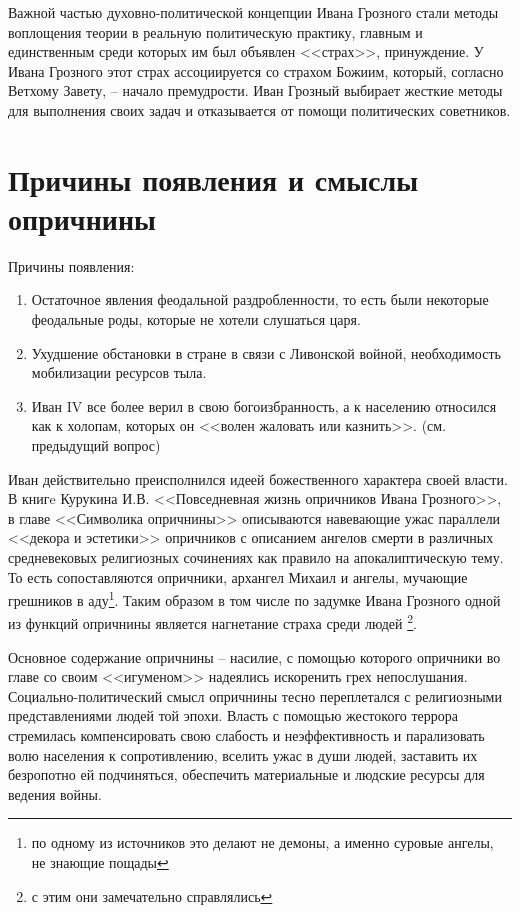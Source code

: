 \documentclass[12pt]{article}
\begin{document}
  Важной частью духовно-политической концепции Ивана Грозного стали методы воплощения теории в реальную политическую практику,
  главным и единственным среди которых им был объявлен <<страх>>, принуждение.
  У  Ивана Грозного этот страх ассоциируется со страхом Божиим, который, согласно Ветхому Завету, -- начало премудрости.
  Иван Грозный выбирает жесткие методы для выполнения своих задач и отказывается от помощи политических советников.

  \section{Причины появления и смыслы опричнины\protect\footnotemark}
  Причины появления:
  \begin{enumerate}
    \item Остаточное явления феодальной раздробленности, то есть были некоторые феодальные роды, которые не хотели слушаться царя.
    \item Ухудшение обстановки в стране в связи с Ливонской войной, необходимость мобилизации ресурсов тыла.
    \item Иван IV все более верил в свою богоизбранность, а к населению относился как к холопам, которых он <<волен жаловать или казнить>>.
      (см. предыдущий вопрос)
  \end{enumerate}

  Иван действительно преисполнился идеей божественного характера своей власти.
  В книгe Курукина И.В. <<Повседневная жизнь опричников Ивана Грозного>>,
  в главе <<Символика опричнины>> описываются навевающие ужас параллели <<декора и эстетики>> опричников
  с описанием ангелов смерти в различных средневековых религиозных сочинениях как правило на апокалиптическую тему.
  То есть сопоставляются опричники, архангел Михаил и ангелы,
  мучающие грешников в аду\footnote{по одному из источников это делают не демоны, а именно суровые ангелы, не знающие пощады}.
  Таким образом в том числе по задумке Ивана Грозного одной из функций опричнины является нагнетание страха среди людей%
  \footnote{с этим они замечательно справлялись}.

  Основное содержание опричнины -- насилие, с помощью которого опричники во главе со своим <<игуменом>> надеялись искоренить грех непослушания.
  Социально-полити\-ческий смысл опричнины тесно переплетался с религиозными представлениями людей той эпохи.
  Власть с помощью жестокого террора стремилась компенсировать свою слабость и неэффективность и парализовать волю населения к сопротивлению,
  вселить ужас в души людей, заставить их безропотно ей подчиняться, обеспечить материальные и людские ресурсы для ведения войны.
\end{document}
